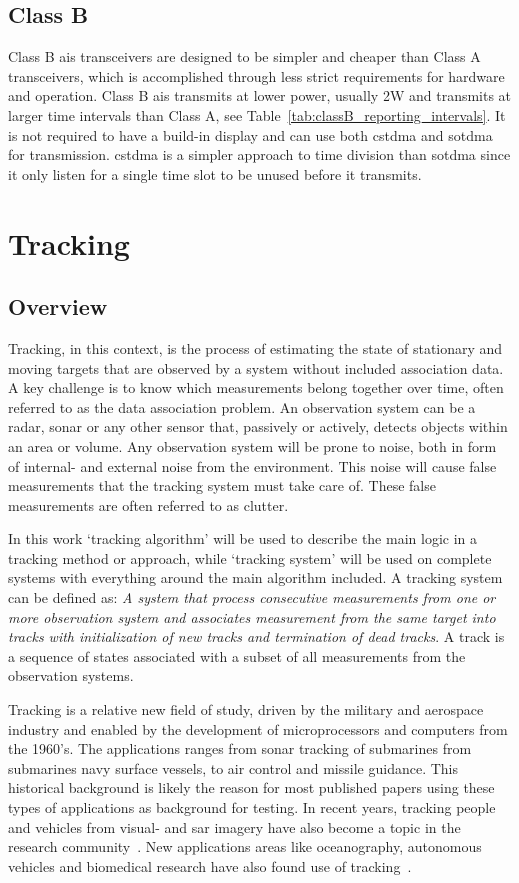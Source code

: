 \subsection{Class B}
Class B \gls{ais} transceivers are designed to be simpler and cheaper than Class A transceivers, which is accomplished through less strict requirements for hardware and operation. Class B \gls{ais} transmits at lower power, usually 2W and transmits at larger time intervals than Class A, see Table~\ref{tab:classB_reporting_intervals}. It is not required to have a build-in display and can use both \gls{cstdma} and \gls{sotdma} for transmission. \gls{cstdma} is a simpler approach to time division than \gls{sotdma} since it only listen for a single time slot to be unused before it transmits.

\section{Tracking}
\subsection{Overview}
Tracking, in this context, is the process of estimating the state of stationary and moving targets that are observed by a system without included association data. A key challenge is to know which measurements belong together over time, often referred to as the data association problem. An observation system can be a radar, sonar or any other sensor that, passively or actively, detects objects within an area or volume. Any observation system will be prone to noise, both in form of internal- and external noise from the environment. This noise will cause false measurements that the tracking system must take care of. These false measurements are often referred to as clutter.

In this work `tracking algorithm' will be used to describe the main logic in a tracking method or approach, while `tracking system' will be used on complete systems with everything around the main algorithm included. A tracking system can be defined as: \emph{A system that process consecutive measurements from one or more observation system and associates measurement from the same target into tracks with initialization of new tracks and termination of dead tracks}. A track is a sequence of states associated with a subset of all measurements from the observation systems. 

Tracking is a relative new field of study, driven by the military and aerospace industry and enabled by the development of microprocessors and computers from the 1960's. The applications ranges from sonar tracking of submarines from submarines navy surface vessels, to air control and missile guidance. This historical background is likely the reason for most published papers using these types of applications as background for testing. In recent years, tracking people and vehicles from visual- and \gls{sar} imagery have also become a topic in the research community~\cite{Carthel2007,Carthel2007a,Coraluppi2000}. New applications areas like oceanography, autonomous vehicles and biomedical research have also found use of tracking~\cite{Wolf2010,Svec2014,Vo2015}.

